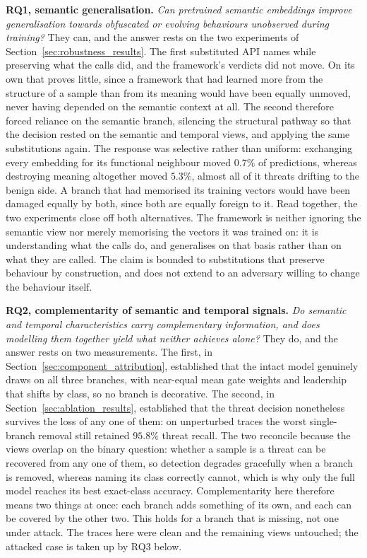 \documentclass[%
    BCOR=10mm,
    DIV=13,
    toc=bibliography,
    toc=listof,
    oneside,
    12pt,
]{scrbook}
\begin{document}
\textbf{RQ1, semantic generalisation.} \emph{Can pretrained semantic embeddings
improve generalisation towards obfuscated or evolving behaviours unobserved during
training?} They can, and the answer rests on the two experiments of
Section~\ref{sec:robustness_results}. The first substituted API names while
preserving what the calls did, and the framework's verdicts did not move. On its own
that proves little, since a framework that had learned more from the structure of a
sample than from its meaning would have been equally unmoved, never having depended
on the semantic context at all. The second therefore forced reliance on the semantic
branch, silencing the structural pathway so that the decision rested on the semantic
and temporal views, and applying the same substitutions again. The response was selective
rather than uniform: exchanging every embedding for its functional neighbour moved
$0.7\%$ of predictions, whereas destroying meaning altogether moved $5.3\%$, almost
all of it threats drifting to the benign side. A branch that had memorised its
training vectors would have been damaged equally by both, since both are equally
foreign to it. Read together, the two experiments close off both alternatives. The
framework is neither ignoring the semantic view nor merely memorising the vectors it
was trained on: it is understanding what the calls do, and generalises on that basis
rather than on what they are called. The claim is bounded to substitutions that
preserve behaviour by construction, and does not extend to an adversary willing to
change the behaviour itself.

\textbf{RQ2, complementarity of semantic and temporal signals.} \emph{Do semantic and
temporal characteristics carry complementary information, and does modelling them
together yield what neither achieves alone?} They do, and the answer rests on two
measurements. The first, in Section~\ref{sec:component_attribution}, established that
the intact model genuinely draws on all three branches, with near-equal mean gate
weights and leadership that shifts by class, so no branch is decorative. The second,
in Section~\ref{sec:ablation_results}, established that the threat decision
nonetheless survives the loss of any one of them: on unperturbed traces the worst
single-branch removal still retained $95.8\%$ threat recall. The two reconcile because the views overlap on
the binary question: whether a sample is a threat can be recovered from any one of
them, so detection degrades gracefully when a branch is removed, whereas naming its
class correctly cannot, which is why only the full model reaches its best exact-class
accuracy. Complementarity here therefore means two things at once: each branch adds
something of its own, and each can be covered by the other two. This holds for a
branch that is missing, not one under attack. The traces here were clean and the
remaining views untouched; the attacked case is taken up by RQ3 below.
\end{document}
